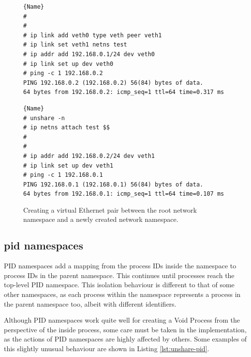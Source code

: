 \documentclass[sigplan]{acmart}
\begin{document}
\begin{figure}
\begin{minipage}{.45\textwidth}

\begin{lstlisting}[frame=tlrb,showlines=true]{Name}
#
#
# ip link add veth0 type veth peer veth1
# ip link set veth1 netns test
# ip addr add 192.168.0.1/24 dev veth0
# ip link set up dev veth0
# ping -c 1 192.168.0.2
PING 192.168.0.2 (192.168.0.2) 56(84) bytes of data.
64 bytes from 192.168.0.2: icmp_seq=1 ttl=64 time=0.317 ms
\end{lstlisting}

\end{minipage}\hfill
\begin{minipage}{.45\textwidth}

\begin{lstlisting}[frame=tlrb]{Name}
# unshare -n
# ip netns attach test $$
#
#
# ip addr add 192.168.0.2/24 dev veth1
# ip link set up dev veth1
# ping -c 1 192.168.0.1
PING 192.168.0.1 (192.168.0.1) 56(84) bytes of data.
64 bytes from 192.168.0.1: icmp_seq=1 ttl=64 time=0.107 ms
\end{lstlisting}

\end{minipage}

\caption{Creating a virtual Ethernet pair between the root network namespace and a newly created network namespace.}
\label{fig:virtual-ethernet}
\end{figure}


\subsection{pid namespaces}
\label{sec:voiding-pid}

PID namespaces add a mapping from the process IDs inside the namespace to process IDs in the parent namespace. This continues until processes reach the top-level PID namespace. This isolation behaviour is different to that of some other namespaces, as each process within the namespace represents a process in the parent namespace too, albeit with different identifiers.

Although PID namespaces work quite well for creating a Void Process from the perspective of the inside process, some care must be taken in the implementation, as the actions of PID namespaces are highly affected by others. Some examples of this slightly unusual behaviour are shown in Listing \ref{lst:unshare-pid}.
\end{document}
